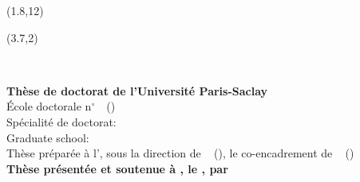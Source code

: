 \begin{textblock}{1}(1.8,12)
	\Large{}
\end{textblock}




\begin{singlespace}
\begin{textblock}{12}(3.7,2)
	
	\color{Prune}
	\begin{flushright}
        \color{Prune}
		\fontsize{22}{26}\selectfont
		\Huge{\PhDTitle} \bigskip \\%
		\normalsize
		\color{black}
		\Large{\textit{\PhDTitleTrad} } \bigskip %
		\vfill
		\vspace{0.8cm}
		\color{black} %
		
		\fontsize{8}{12}\selectfont
		\normalsize \textbf{Thèse de doctorat de l'Université Paris-Saclay} \\ \bigskip
		\vspace{5mm}
		\vfill
		\small{École doctorale n$^{\circ}$\ecodocnum ~\ecodoctitle ~(\ecodocacro)}  \\
		\small{Spécialité de doctorat: \PhDspeciality} \bigskip \\%
		\small{Graduate school: \GradSchool} \bigskip \\
		\vspace{5mm}
		\vfill 
		\footnotesize Thèse préparée à l'\PhDworkingplace, sous la direction de \jurynameE ~ (\juryadressE), le co-encadrement de \jurynameF ~ (\juryadressF)\\
		\vspace{5mm}
		\textbf{Thèse présentée et soutenue à , le , par} \bigskip
		\vfill
		\Large{\color{Prune}\textbf{\textsc{\PhDname}}} %
		\vfill
	\end{flushright}
	

\end{textblock}
\end{singlespace}
